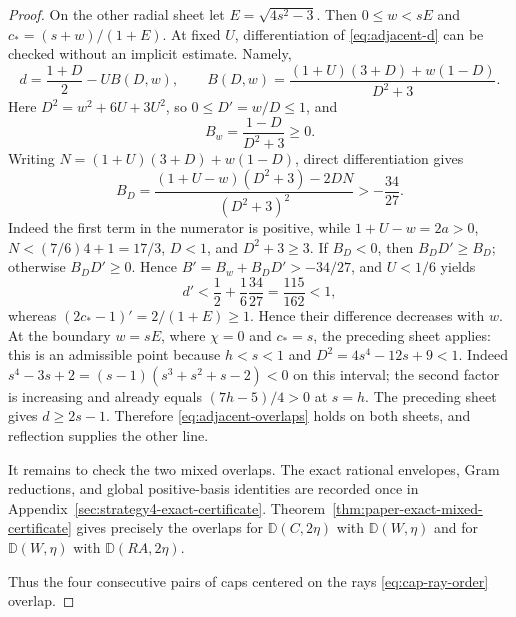 \begin{proof}
On the other radial sheet let $E=\sqrt{4s^2-3}$.  Then
$0\le w<sE$ and $c_*=(s+w)/(1+E)$.  At fixed $U$, differentiation of
\eqref{eq:adjacent-d} can be checked without an implicit estimate.  Namely,
\[
 d=\frac{1+D}{2}-UB(D,w),\qquad
 B(D,w)=\frac{(1+U)(3+D)+w(1-D)}{D^2+3}.
\]
Here $D^2=w^2+6U+3U^2$, so $0\le D'=w/D\le1$, and
\[
 B_w=\frac{1-D}{D^2+3}\ge0.
\]
Writing $N=(1+U)(3+D)+w(1-D)$, direct differentiation gives
\[
 B_D=\frac{(1+U-w)(D^2+3)-2DN}{(D^2+3)^2}>-\frac{34}{27}.
\]
Indeed the first term in the numerator is positive, while
$1+U-w=2a>0$, $N<(7/6)4+1=17/3$, $D<1$, and $D^2+3\ge3$.  If $B_D<0$, then
$B_DD'\ge B_D$; otherwise $B_DD'\ge0$.  Hence
$B'=B_w+B_DD'>-34/27$, and $U<1/6$ yields
\[
 d'<\frac12+\frac16\frac{34}{27}=\frac{115}{162}<1,
\]
whereas
$(2c_*-1)'=2/(1+E)\ge1$.  Hence their difference decreases with $w$.
At the boundary $w=sE$, where $\chi=0$ and $c_*=s$, the preceding sheet
applies: this is an admissible point because $h<s<1$ and
$D^2=4s^4-12s+9<1$.  Indeed
$s^4-3s+2=(s-1)(s^3+s^2+s-2)<0$ on this interval; the second factor is
increasing and already equals $(7h-5)/4>0$ at $s=h$.  The preceding sheet gives
$d\ge2s-1$.  Therefore \eqref{eq:adjacent-overlaps} holds on both
sheets, and reflection supplies the other line.

It remains to check the two mixed overlaps.  The exact rational envelopes, Gram reductions, and global positive-basis identities are recorded once in Appendix~\ref{sec:strategy4-exact-certificate}. Theorem~\ref{thm:paper-exact-mixed-certificate} gives precisely the overlaps for
$\mathbb D(C,2\eta)$ with $\mathbb D(W,\eta)$ and for
$\mathbb D(W,\eta)$ with $\mathbb D(RA,2\eta)$.

Thus the four consecutive pairs of caps centered on the rays
\eqref{eq:cap-ray-order} overlap.
\end{proof}
